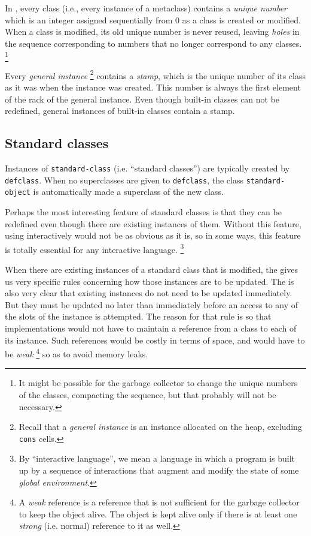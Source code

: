 In \sysname{}, every class (i.e., every instance of a metaclass)
contains a \emph{unique number} which is an integer assigned
sequentially from $0$ as a class is created or modified.  When a class
is modified, its old unique number is never reused, leaving
\emph{holes} in the sequence corresponding to numbers that no longer
correspond to any classes.%
\footnote{It might be possible for the garbage collector to change the
  unique numbers of the classes, compacting the sequence, but that
  probably will not be necessary.}


Every \emph{general instance}%
\footnote{Recall that a \emph{general instance} is an instance
  allocated on the heap, excluding \texttt{cons}
  cells. } contains a \emph{stamp},
which is the unique number of its class as it was when the instance
was created.  This number is always the first element of the rack of
the general instance.  Even though built-in classes can not be
redefined, general instances of built-in classes contain a stamp.

\subsection{Standard classes}
\label{object-system-standard-classes}

Instances of \texttt{standard-class} (i.e. ``standard classes'') are
typically created by \texttt{defclass}.  When no superclasses are
given to \texttt{defclass}, the class \texttt{standard-object} is
automatically made a superclass of the new class.  

Perhaps the most interesting feature of standard classes is that they
can be redefined even though there are existing instances of them.
Without this feature, using \commonlisp{} interactively would not be as
obvious as it is, so in some ways, this feature is totally essential
for any interactive language.%
\footnote{By ``interactive language'', we mean a language in which a
  program is built up by a sequence of interactions that augment and
  modify the state of some \emph{global environment}.}

When there are existing instances of a standard class that is
modified, the \hs{} gives us very specific rules concerning how
those instances are to be updated.  The \hs{} is also very clear
that existing instances do not need to be updated immediately.  But
they must be updated no later than immediately before an access to any
of the slots of the instance is attempted.   The reason for that rule
is so that implementations would not have to maintain a reference from
a class to each of its instance.  Such references would be costly in
terms of space, and would have to be \emph{weak}%
\footnote{A \emph{weak} reference is a reference that is not
  sufficient for the garbage collector to keep the object alive.  The
  object is kept alive only if there is at least one \emph{strong}
  (i.e. normal) reference to it as well.}  so as to avoid memory
leaks.

